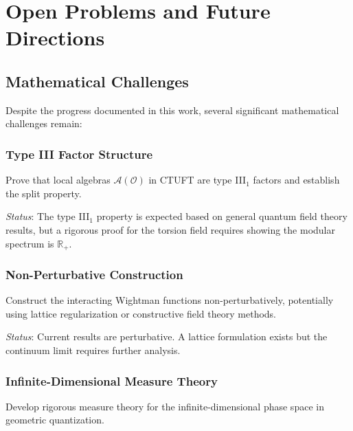 \section{Open Problems and Future Directions}
\label{sec:open_problems}

\subsection{Mathematical Challenges}

Despite the progress documented in this work, several significant mathematical challenges remain:

\subsubsection{Type III Factor Structure}

\begin{problem}
Prove that local algebras $\mathcal{A}(\mathcal{O})$ in CTUFT are type III$_1$ factors and establish the split property.
\end{problem}

\textit{Status}: The type III$_1$ property is expected based on general quantum field theory results, but a rigorous proof for the torsion field requires showing the modular spectrum is $\mathbb{R}_+$.

\subsubsection{Non-Perturbative Construction}

\begin{problem}
Construct the interacting Wightman functions non-perturbatively, potentially using lattice regularization or constructive field theory methods.
\end{problem}

\textit{Status}: Current results are perturbative. A lattice formulation exists but the continuum limit requires further analysis.

\subsubsection{Infinite-Dimensional Measure Theory}

\begin{problem}
Develop rigorous measure theory for the infinite-dimensional phase space in geometric quantization.
\end{problem}

